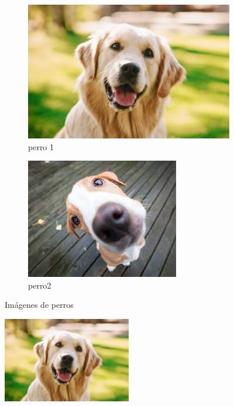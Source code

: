 \documentclass[]{article}
\begin{document}
\begin{figure}
	\begin{subfigure}{0.5\textwidth}
		\includegraphics[width = \textwidth ]{perro1.jpg}
		\caption{perro 1}
	\end{subfigure}
	\begin{subfigure}{0.5\textwidth} 
		\includegraphics[width =\textwidth ]{perro2.jpg}
		\caption{perro2}
	\end{subfigure}
\caption{Imágenes de perros}
\end{figure}

\lipsum[1-5]

\begin{figure}
	\includegraphics[width = 0.5\textwidth]{perro1.jpg}
\end{figure}
\end{document}
